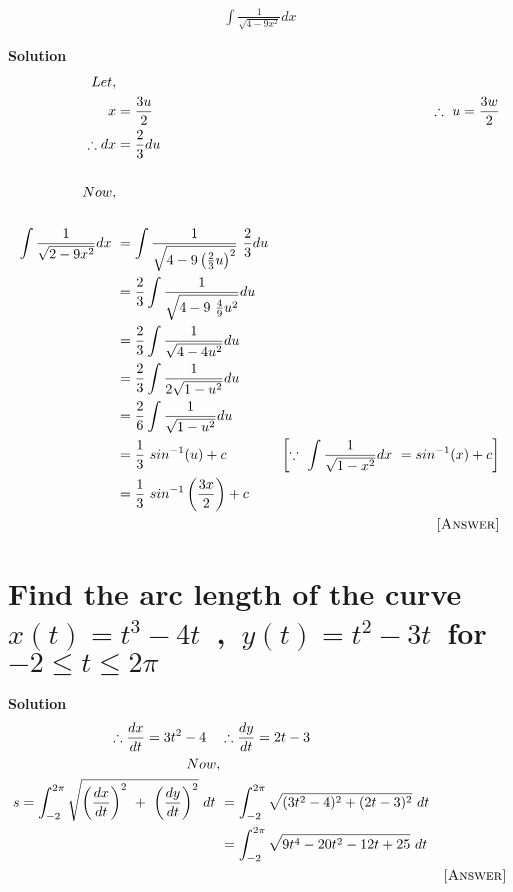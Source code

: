 \documentclass[12pt]{article}
\begin{document}
\begin{align*}
    \int\frac{1}{\sqrt{4-9x^2}}dx
\end{align*}


\textbf{Solution}
\begin{align*}
    Let,\\ x&= \frac{3u}{2} & \therefore\ u=\frac{3w}{2}\\
    \therefore dx&=\frac{2}{3}du\\\\
    Now,\\\\ \int\frac{1}{\sqrt{2-9x^2}}dx\ &=\int\frac{1}{\sqrt{4-9\left(\frac{2}{3}u\right)^2}}\ \frac{2}{3}du\\
    &=\frac{2}{3} \int\frac{1}{\sqrt{4-9\ \frac{4}{9}u^2}}du\\
    &=\frac{2}{3} \int\frac{1}{\sqrt{4-4u^2}}du\\
    &=\frac{2}{3} \int\frac{1}{2\sqrt{1-u^2}}du\\
    &=\frac{2}{6} \int\frac{1}{\sqrt{1-u^2}}du\\
    &= \frac{1}{3}\ sin^{-1}(u)+c & \left[\because\ \int\frac{1}{\sqrt{1-x^2}}dx\ = sin^{-1}(x)+c\right]\\
    &=\frac{1}{3}\ sin^{-1}\left(\frac{3x}{2}\right)+c\\
     & & \textsc{[Answer]}
\end{align*}
\pagebreak


\section{Find the arc length of the curve\ $x(t)=t^3-4t$\ ,\ $y(t)=t^2-3t$\ for $-2\leq t \leq 2\pi$}




\textbf{Solution}
\begin{align*}
    \therefore \frac{dx}{dt}=3t^2-4\quad & \therefore \frac{dy}{dt}=2t-3\\
    Now,\\ s=\int_{-2}^{2\pi}\sqrt{\left(\frac{dx}{dt}\right)^2\ +\ \left(\frac{dy}{dt}\right)^2}\ dt\ &=\int_{-2}^{2\pi}\sqrt{(3t^2-4)^2 + (2t-3)^2}\ dt\\
    &=\int_{-2}^{2\pi}\sqrt{9t^4-20t^2-12t+25}\ dt\\
    & & \textsc{[Answer]}
\end{align*}
\pagebreak
\end{document}
